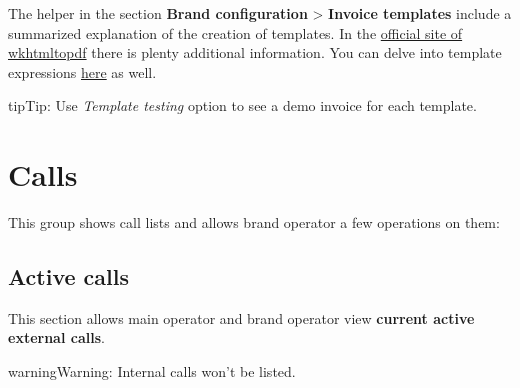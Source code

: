 \documentclass[letterpaper,10pt,english]{sphinxmanual}
\begin{document}
The helper in the section \textbf{Brand configuration} \textgreater{} \textbf{Invoice templates} include
a summarized explanation of the creation of templates. In the \href{https://wkhtmltopdf.org/usage/wkhtmltopdf.txt}{official site of wkhtmltopdf} there is plenty additional information.
You can delve into template expressions \href{http://handlebarsjs.com/expressions.html}{here} as well.

\begin{notice}{tip}{Tip:}
Use \emph{Template testing} option to see a demo invoice for each template.
\end{notice}


\section{Calls}
\label{administration_portal/brand/calls/index::doc}\label{administration_portal/brand/calls/index:calls}
This group shows call lists and allows brand operator a few operations on them:


\subsection{Active calls}
\label{administration_portal/brand/calls/active_calls::doc}\label{administration_portal/brand/calls/active_calls:active-calls}
This section allows main operator and brand operator view \textbf{current active external calls}.

\begin{notice}{warning}{Warning:}
Internal calls won't be listed.
\end{notice}
\end{document}
